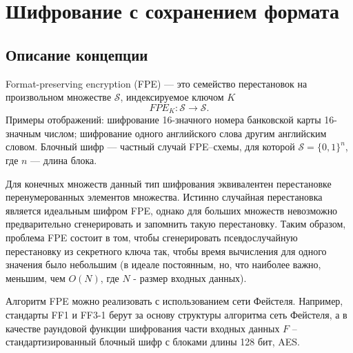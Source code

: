 \documentclass[utf8x, 14pt]{G7-32} %
\begin{document}
\frontmatter %

\maketitle %


\begin{executors}
\end{executors}

\tableofcontents %
 



\mainmatter %

\chapter{Шифрование с сохранением формата}

\section{Описание концепции}
Format-preserving encryption (FPE) --- это семейство перестановок на произвольном множестве $\mathcal{S}$, индексируемое ключом $K$ \cite{ruscrypto}
$$FPE_K: \mathcal{S} \to \mathcal{S}.$$
 Примеры отображений: шифрование 16-значного номера банковской карты 16-значным числом; шифрование одного английского слова другим английским словом. Блочный шифр --- частный случай FPE--схемы, для которой  $\mathcal{S} = \{0,1\}^n$, где $n$ --- длина блока.


Для конечных множеств данный тип шифрования эквивалентен перестановке перенумерованных элементов множества. Истинно случайная перестановка является идеальным шифром FPE, однако для больших множеств невозможно предварительно сгенерировать и запомнить такую перестановку. Таким образом, проблема FPE состоит в том, чтобы сгенерировать псевдослучайную перестановку из секретного ключа так, чтобы время вычисления для одного значения было небольшим (в идеале постоянным, но, что наиболее важно, меньшим, чем $O(N)$, где $N$ - размер входных данных).


Алгоритм FPE можно реализовать с использованием сети Фейстеля. Например, стандарты FF1 и FF3-1 \cite{FF13-1} берут за основу структуры алгоритма сеть Фейстеля, а в качестве раундовой функции шифрования части входных данных $F$ -- стандартизированный блочный шифр с блоками длины 128 бит, AES.
\end{document}
